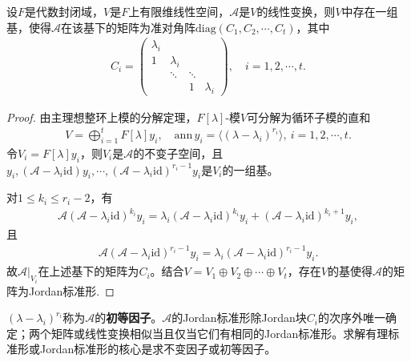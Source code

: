 \documentclass[../../main.tex]{subfiles}%
\begin{document}
\begin{theorem}
设$F$是代数封闭域，$V$是$F$上有限维线性空间，$\mathscr{A}$是$V$的线性变换，则$V$中存在一组基，使得$\mathscr{A}$在该基下的矩阵为准对角阵$\mathrm{diag}(C_1,C_2,\cdots,C_t)$，其中
\begin{align*}
C_i=
\begin{pmatrix}
\lambda_i&&&\\
1&\lambda_i&&\\
&\ddots&\ddots&\\
&&1&\lambda_i
\end{pmatrix},\quad i=1,2,\cdots,t.
\end{align*}
\end{theorem}
\begin{proof}

由主理想整环上模的分解定理，$F[\lambda]$-模$V$可分解为循环子模的直和
\begin{align*}
V=\bigoplus_{i=1}^t F[\lambda]y_i,\quad \mathrm{ann}\,y_i=\langle(\lambda-\lambda_i)^{r_i}\rangle,\ i=1,2,\cdots,t.
\end{align*}
令$V_i=F[\lambda]y_i$，则$V_i$是$\mathscr{A}$的不变子空间，且$y_i,(\mathscr{A}-\lambda_i\mathrm{id})y_i,\cdots,(\mathscr{A}-\lambda_i\mathrm{id})^{r_i-1}y_i$是$V_i$的一组基。

对$1\leqslant k_i\leqslant r_i-2$，有
\begin{align*}
\mathscr{A}(\mathscr{A}-\lambda_i\mathrm{id})^{k_i}y_i=\lambda_i(\mathscr{A}-\lambda_i\mathrm{id})^{k_i}y_i+(\mathscr{A}-\lambda_i\mathrm{id})^{k_i+1}y_i,
\end{align*}
且
\begin{align*}
\mathscr{A}(\mathscr{A}-\lambda_i\mathrm{id})^{r_i-1}y_i=\lambda_i(\mathscr{A}-\lambda_i\mathrm{id})^{r_i-1}y_i.
\end{align*}
故$\mathscr{A}|_{V_i}$在上述基下的矩阵为$C_i$。结合$V=V_1\oplus V_2\oplus\cdots\oplus V_t$，存在$V$的基使得$\mathscr{A}$的矩阵为Jordan标准形.

\end{proof}
\begin{remark}
$(\lambda-\lambda_i)^{r_i}$称为$\mathscr{A}$的\textbf{初等因子}。$\mathscr{A}$的Jordan标准形除Jordan块$C_i$的次序外唯一确定；两个矩阵或线性变换相似当且仅当它们有相同的Jordan标准形。求解有理标准形或Jordan标准形的核心是求不变因子或初等因子。
\end{remark}
\end{document}
